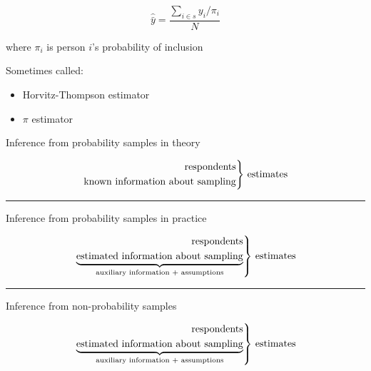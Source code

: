 \documentclass[aspectratio=169]{beamer}
\newenvironment{rcases}
  {\left.\begin{aligned}}
  {\end{aligned}\right\rbrace}
\begin{document}
\begin{frame}

\begin{equation*}
\hat{\bar{y}} = \frac{\sum_{i \in s} y_i / \pi_i }{N}
\end{equation*}

where $\pi_i$ is person $i$'s probability of inclusion

\vfill

Sometimes called:
\begin{itemize}
\item Horvitz-Thompson estimator
\item $\pi$ estimator
\end{itemize}

\end{frame}
\begin{frame}

\begin{center}
{\Large Inference from probability samples in theory}
\end{center}

\begin{equation*}
\begin{rcases}
  \text{respondents} \\
  \text{known information about sampling}
\end{rcases}
\text{ estimates}
\end{equation*}

\pause

\vfill
\noindent\rule{\textwidth}{0.4pt}
\begin{center}
{\Large Inference from probability samples in practice}
\end{center}

\begin{equation*}
\begin{rcases}
  \text{respondents} \\
  \underbrace{\text{estimated information about sampling}}_{\text{auxiliary information + assumptions}}
\end{rcases}
\text{ estimates}
\end{equation*}

\pause 

\vfill
\noindent\rule{\textwidth}{0.4pt}

\begin{center}
{\Large Inference from non-probability samples}
\end{center}

\begin{equation*}
\begin{rcases}
  \text{respondents} \\
  \underbrace{\text{estimated information about sampling}}_{\text{auxiliary information + assumptions}}
\end{rcases}
\text{ estimates}
\end{equation*}

\end{frame}
\end{document}

